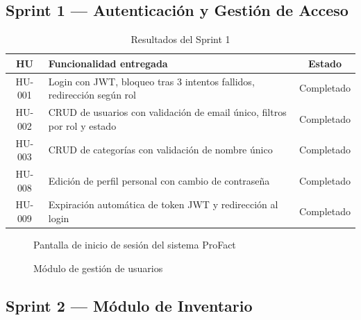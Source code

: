 \documentclass[12pt, letterpaper]{report}
\begin{document}
\subsection{Sprint 1 --- Autenticación y Gestión de Acceso}

\begin{table}[H]
\centering
\caption{Resultados del Sprint 1}
\renewcommand{\arraystretch}{1.3}
\begin{tabularx}{\textwidth}{|c|X|c|}
\hline
\textbf{HU} & \textbf{Funcionalidad entregada} & \textbf{Estado} \\ \hline
HU-001 & Login con JWT, bloqueo tras 3 intentos fallidos, redirección según rol & Completado \\ \hline
HU-002 & CRUD de usuarios con validación de email único, filtros por rol y estado & Completado \\ \hline
HU-003 & CRUD de categorías con validación de nombre único & Completado \\ \hline
HU-008 & Edición de perfil personal con cambio de contraseña & Completado \\ \hline
HU-009 & Expiración automática de token JWT y redirección al login & Completado \\ \hline
\end{tabularx}
\end{table}

\begin{figure}[H]
\centering
{}
\caption{Pantalla de inicio de sesión del sistema ProFact}
\label{fig:sprint1-login}
\end{figure}

\begin{figure}[H]
\centering
{}
\caption{Módulo de gestión de usuarios}
\label{fig:sprint1-usuarios}
\end{figure}

\subsection{Sprint 2 --- Módulo de Inventario}
\end{document}
